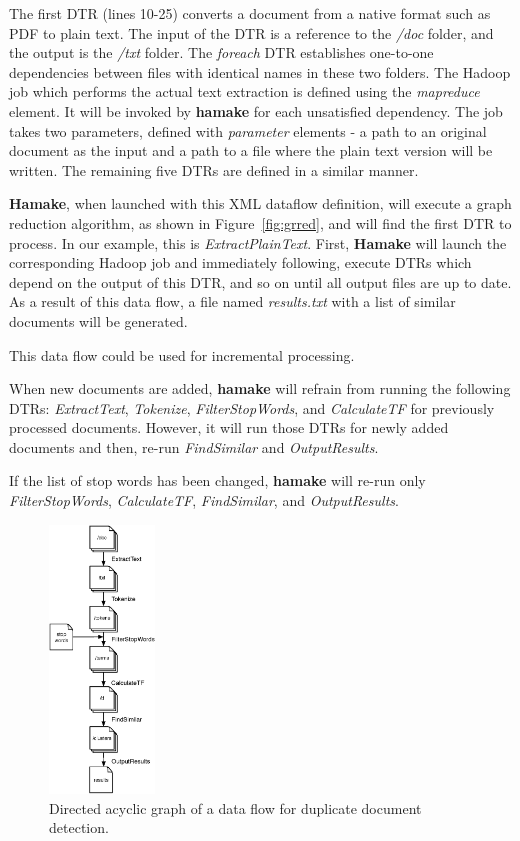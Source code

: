 \documentclass[a4paper,twoside]{article}
\begin{document}


The first DTR (lines 10-25) converts a document from a native format such
as PDF to plain text. The input of the DTR is a reference to the
\emph{/doc} folder, and the output is the \emph{/txt} folder. The
\emph{foreach} DTR establishes one-to-one dependencies between files
with identical names in these two folders. The Hadoop job which
performs the actual text extraction is defined using the \emph{mapreduce}
element. It will be invoked by \textbf{hamake} for each unsatisfied
dependency. The job takes two parameters, defined with
\emph{parameter} elements - a path to an original document as the input and a path to a file where the plain text version will be written. The remaining five DTRs are defined in a similar manner.

\textbf{Hamake}, when launched with this XML dataflow definition, will execute a graph reduction algorithm, as shown in Figure~\ref{fig:grred}, and will find the first DTR to process. In our example, this is
\emph{ExtractPlainText}. First, \textbf{Hamake} will launch the  corresponding Hadoop job and immediately following, execute DTRs which depend on the output of this DTR, and so on until all output files are up to date. As a result of this data flow, a file named
\emph{results.txt} with a list of similar documents will be generated.

This data flow could be used for incremental processing. 

When new documents are added, \textbf{hamake} will refrain from running the following DTRs: \emph{ExtractText}, \emph{Tokenize}, \emph{FilterStopWords}, and \emph{CalculateTF} for previously processed documents. However, it will run those DTRs for newly added documents and then, re-run \emph{FindSimilar} and \emph{OutputResults}. 

If the list of stop
words has been changed, \textbf{hamake} will re-run only
\emph{FilterStopWords}, \emph{CalculateTF}, \emph{FindSimilar}, and
\emph{OutputResults}.

\begin{figure}[htp]
\centering
\includegraphics[width=0.25\textwidth]{SimilarityAlgDAG.eps}
\caption{Directed acyclic graph of a data flow for duplicate document detection.}
\label{fig:SimilarityAlgDAG}
\end{figure}
\end{document}
